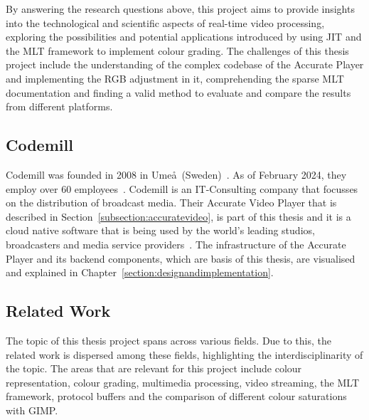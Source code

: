 \documentclass[../MasterThesis.tex]{subfiles}
\begin{document}
	
	By answering the research questions above, this project aims to provide insights into the technological and scientific aspects of real-time video processing, exploring the possibilities and potential applications introduced by using JIT and the MLT framework to implement colour grading. 
	The challenges of this thesis project include the understanding of the complex codebase of the Accurate Player and implementing the RGB adjustment in it, comprehending the sparse MLT documentation and finding a valid method to evaluate and compare the results from different platforms.
	
	

	
	
	
	
\newpage	
	\subsection{Codemill} \label{subsection:codemill}
	
	Codemill was founded in 2008 in Ume\aa \ (Sweden)~\cite{codemill_now, codemill_old}.
	As of February 2024, they employ over 60 employees~\cite{codemill}. 
	Codemill is an IT-Consulting company that focusses on the distribution of broadcast media. Their Accurate Video Player that is described in Section~\ref{subsection:accuratevideo}, is part of this thesis and it is a cloud native software that is being used by the world's leading studios, broadcasters and media service providers~\cite{codemill_linkedin, codemill_avp}.
	The infrastructure of the Accurate Player and its backend components, which are basis of this thesis, are visualised and explained in Chapter~\ref{section:designandimplementation}.
	
	
	
	
	
	
	
	
	
	
	
	
	\subsection{Related Work} \label{subsection:relatedwork}
	
	The topic of this thesis project spans across various fields. 
	Due to this, the related work is dispersed among these fields, highlighting the interdisciplinarity of the topic.
	The areas that are relevant for this project include colour representation, colour grading, multimedia processing, video streaming, the MLT framework, protocol buffers and the comparison of different colour saturations with GIMP.
\end{document}
